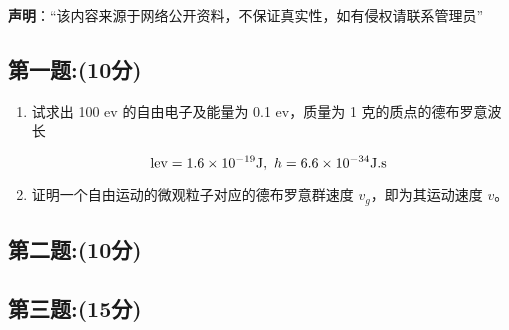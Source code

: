 
\textbf{声明}：“该内容来源于网络公开资料，不保证真实性，如有侵权请联系管理员”

\subsection{第一题:(10分)}
\begin{enumerate}
  \item 试求出 100 ev 的自由电子及能量为 0.1 ev，质量为 1 克的质点的德布罗意波长

  \[  \text{lev} = 1.6 \times 10^{-19} \\ \text{J}, \ h = 6.6 \times 10^{-34} \\ \text{J.s}~\]

  \item 证明一个自由运动的微观粒子对应的德布罗意群速度 $v_g$，即为其运动速度 $v$。
\end{enumerate}
\subsection{第二题:(10分)}

\subsection{第三题:(15分)}